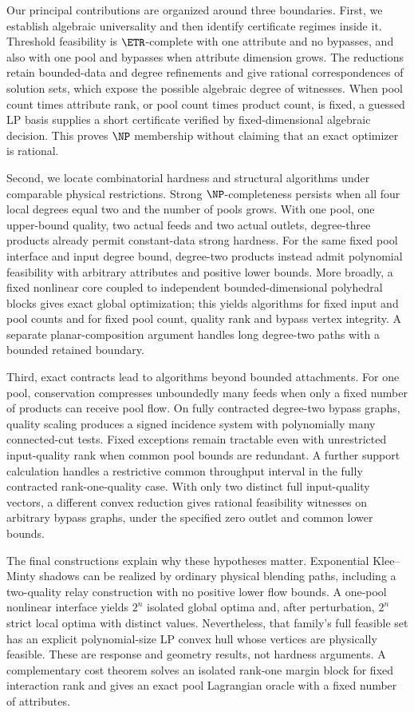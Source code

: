 Our principal contributions are organized around three boundaries.
First, we establish algebraic universality and then identify certificate
regimes inside it. Threshold feasibility is $\ETR$-complete with one
attribute and no bypasses, and also with one pool and bypasses when
attribute dimension grows. The reductions retain bounded-data and
degree refinements and give rational correspondences of solution sets,
which expose the possible algebraic degree of witnesses.
When pool count times attribute rank, or pool count times product count,
is fixed, a guessed LP basis supplies a short certificate verified by
fixed-dimensional algebraic decision. This proves $\NP$ membership
without claiming that an exact optimizer is rational.

Second, we locate combinatorial hardness and structural algorithms under
comparable physical restrictions. Strong $\NP$-completeness persists when
all four local degrees equal two and the number of pools grows. With
one pool, one upper-bound quality, two actual feeds and two actual
outlets, degree-three products already permit constant-data strong
hardness. For the same fixed pool interface and input degree bound,
degree-two products instead admit polynomial feasibility with arbitrary
attributes and positive lower bounds. More broadly, a fixed nonlinear
core coupled to independent bounded-dimensional polyhedral blocks gives
exact global optimization; this yields algorithms for fixed input and
pool counts and for fixed pool count, quality rank and bypass vertex
integrity. A separate planar-composition argument handles long degree-two
paths with a bounded retained boundary.

Third, exact contracts lead to algorithms beyond bounded attachments.
For one pool, conservation compresses unboundedly many feeds when only
a fixed number of products can receive pool flow. On fully contracted
degree-two bypass graphs, quality scaling produces a signed incidence
system with polynomially many connected-cut tests. Fixed exceptions
remain tractable even with unrestricted input-quality rank when common
pool bounds are redundant. A further support calculation handles a
restrictive common throughput interval in the fully contracted
rank-one-quality case. With only two distinct full input-quality vectors,
a different convex reduction gives rational feasibility witnesses on
arbitrary bypass graphs, under the specified zero outlet and common
lower bounds.

The final constructions explain why these hypotheses matter.
Exponential Klee--Minty shadows can be realized by ordinary physical
blending paths, including a two-quality relay construction with no
positive lower flow bounds. A one-pool nonlinear interface yields
$2^n$ isolated global optima and, after perturbation, $2^n$ strict local
optima with distinct values. Nevertheless, that family's full feasible
set has an explicit polynomial-size LP convex hull whose vertices are
physically feasible. These are response and geometry results, not
hardness arguments. A complementary cost theorem solves an isolated
rank-one margin block for fixed interaction rank and gives an exact
pool Lagrangian oracle with a fixed number of attributes.

